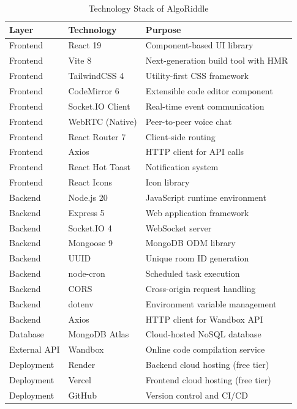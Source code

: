 \begin{table}[H]
\centering
\caption{Technology Stack of AlgoRiddle}
\label{tab:techstack}
\begin{reporttable}
\begin{tabular}{@{} l l p{6.5cm} @{}}
\toprule
\textbf{Layer} & \textbf{Technology} & \textbf{Purpose} \\
\midrule
Frontend & React 19 & Component-based UI library \\
Frontend & Vite 8 & Next-generation build tool with HMR \\
Frontend & TailwindCSS 4 & Utility-first CSS framework \\
Frontend & CodeMirror 6 & Extensible code editor component \\
Frontend & Socket.IO Client & Real-time event communication \\
Frontend & WebRTC (Native) & Peer-to-peer voice chat \\
Frontend & React Router 7 & Client-side routing \\
Frontend & Axios & HTTP client for API calls \\
Frontend & React Hot Toast & Notification system \\
Frontend & React Icons & Icon library \\
\midrule
Backend & Node.js 20 & JavaScript runtime environment \\
Backend & Express 5 & Web application framework \\
Backend & Socket.IO 4 & WebSocket server \\
Backend & Mongoose 9 & MongoDB ODM library \\
Backend & UUID & Unique room ID generation \\
Backend & node-cron & Scheduled task execution \\
Backend & CORS & Cross-origin request handling \\
Backend & dotenv & Environment variable management \\
Backend & Axios & HTTP client for Wandbox API \\
\midrule
Database & MongoDB Atlas & Cloud-hosted NoSQL database \\
\midrule
External API & Wandbox & Online code compilation service \\
\midrule
Deployment & Render & Backend cloud hosting (free tier) \\
Deployment & Vercel & Frontend cloud hosting (free tier) \\
Deployment & GitHub & Version control and CI/CD \\
\bottomrule
\end{tabular}
\end{reporttable}
\end{table}

